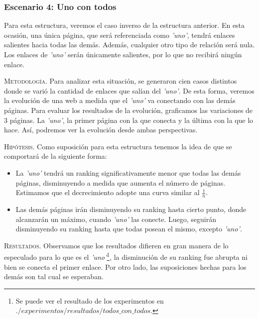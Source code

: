 \subsubsection{Escenario 4: Uno con todos} Para esta estructura, veremos el caso inverso de la estructura anterior. En esta ocasión, una única página, que será referenciada como \textit{'uno'}, tendrá enlaces salientes hacia todas las demás. Además, cualquier otro tipo de relación será nula. Los enlaces de \textit{'uno'} serán únicamente salientes, por lo que no recibirá ningún enlace.

\vspace{1em}

\vspace{1em}
\noindent \textsc{Metodología}. Para analizar esta situación, se generaron cien casos distintos donde se varió la cantidad de enlaces que salían del \textit{'uno'}. De esta forma, veremos la evolución de una web a medida que el \textit{'uno'} va conectando con las demás páginas. Para evaluar los resultados de la evolución, graficamos las variaciones de 3 páginas. La \textit{'uno'}, la primer página con la que conecta y la última con la que lo hace. Así, podremos ver la evolución desde ambas perspectivas.

\vspace{1em}
\noindent \textsc{Hipótesis}. Como suposición para esta estructura tenemos la idea de que se comportará de la siguiente forma:
\begin{itemize}
\item La \textit{'uno'} tendrá un ranking significativamente menor que todas las demás páginas, disminuyendo a medida que aumenta el número de páginas. Estimamos que el decrecimiento adopte una curva similar al \(\frac{1}{n}\).
\item Las demás páginas irán disminuyendo su ranking hasta cierto punto, donde alcanzarán un máximo, cuando \textit{'uno'} las conecte. Luego, seguirán disminuyendo su ranking hasta que todas posean el mismo, excepto \textit{'uno'}.
\end{itemize}

\vspace{1em}
\noindent \textsc{Resultados}. Observamos que los resultados difieren en gran manera de lo especulado para lo que es el \textit{'uno'}\footnote{Se puede ver el resultado de los experimentos en $./experimentos/resultados/todos\_con\_todos$.}, la disminución de su ranking fue abrupta ni bien se conecta el primer enlace.
Por otro lado, las suposiciones hechas para los demás son tal cual se esperaban.




